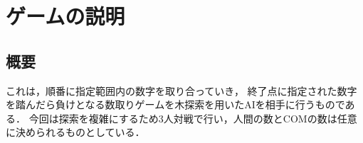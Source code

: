 \documentclass[a4paper,10pt]{jsarticle}
\makeatletter
\def\@thesis{人工知能特論最終レポート}
\def\id#1{\def\@id{#1}}
\def\id#1{\def\@id{#1}}
\def\idone#1{\def\@idone{#1}}
\def\idtwo#1{\def\@idtwo{#1}}
\def\idthree#1{\def\@idthree{#1}}
\def\memberone#1{\def\@memberone{#1}}
\def\membertwo#1{\def\@membertwo{#1}}
\def\memberthree#1{\def\@memberthree{#1}}
\def\department#1{\def\@department{#1}}
\makeatother
\begin{document}
\def\@maketitle{
\begin{center}
  {\huge \vspace{100mm} \@thesis \par}
\end{center}
\begin{flushright}
  \vspace{170mm}
  {\Large \@date\par}              　　%
  {\Large \@department \par}       　　%
\end{flushright}
\begin{flushleft}
  \hspace{113mm}
  {\large \@id}
  {\large \@author \par}               %
  \hspace{127mm}
  {\small \@idone}
  {\small \@memberone \par}            %
  \hspace{127mm}
  {\small \@idtwo}
  {\small \@membertwo \par}                　　%
  \hspace{116mm}
  \hspace{1em}
  {\small \@idthree}
  {\small \@memberthree \par}                　　%
  \vskip 1.5em
\end{flushleft}
}

\makeatother
\date{\today}
\department{チーム : F}
\id{○ M18J4043M}
\author{中島 太知}
\idone{M18J4024Z}
\memberone{阪本 光翼}
\idtwo{M18J4026M}
\membertwo{佐藤 洸亮}
\idthree{M18J4059B}
\memberthree{三宅 裕稀}

\maketitle
\thispagestyle{empty}     %
\clearpage
\addtocounter{page}{-1}

\newpage

\section{ゲームの説明}
\subsection{概要}
これは，順番に指定範囲内の数字を取り合っていき，
終了点に指定された数字を踏んだら負けとなる数取りゲームを木探索を用いたAIを相手に行うものである．
今回は探索を複雑にするため3人対戦で行い，人間の数とCOMの数は任意に決められるものとしている．
\end{document}
